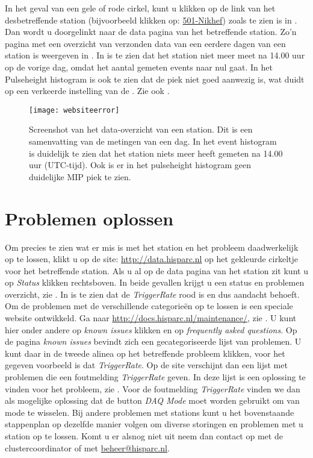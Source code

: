 In het geval van een gele of rode cirkel, kunt u klikken op de link van
het desbetreffende station (bijvoorbeeld klikken op:
\underline{501-Nikhef}) zoals te zien is in . Dan
wordt u doorgelinkt naar de data pagina van het betreffende station.
Zo'n pagina met een overzicht van verzonden data van een eerdere dagen
van een station is weergeven in . In
 is te zien dat het station niet meer meet na
14.00 uur op de vorige dag,  omdat het aantal gemeten events naar nul
gaat. In het Pulseheight histogram is ook te zien dat de \mip piek niet
goed aanwezig is, wat duidt op een verkeerde instelling van de \pmt. Zie
ook \cite{inregelen}.

\begin{figure} 
    \centering 
    \texttt{[image: websiteerror]}
    \caption{Screenshot van het data-overzicht van een station. Dit is
             een samenvatting van de metingen van een dag. In het event
             histogram is duidelijk te zien dat het station niets meer
             heeft gemeten na 14.00 uur (UTC-tijd). Ook is er in het
             pulseheight histogram geen duidelijke MIP piek te zien.}
    \label{fig:websiteerror} 
\end{figure}


\section{Problemen oplossen}

Om precies te zien wat er mis is met het station en het probleem
daadwerkelijk op te lossen, klikt u op de site:
\url{http://data.hisparc.nl} op het gekleurde cirkeltje voor het
betreffende station. Als u al op de data pagina van het station zit kunt
u op \emph{Status} klikken rechtsboven. In beide gevallen krijgt u een
status en problemen overzicht, zie . In
 is te zien dat de \emph{TriggerRate} rood is
en dus aandacht behoeft. Om de problemen met de verschillende
categorieën op te lossen is een speciale website ontwikkeld. Ga naar
\url{http://docs.hisparc.nl/maintenance/}, zie .
U kunt hier onder andere op \emph{known issues} klikken en op
\emph{frequently asked questions}. Op de pagina \emph{known issues}
bevindt zich een gecategoriseerde lijst van problemen. U kunt daar in de
tweede alinea op het betreffende probleem klikken, voor het gegeven
voorbeeld is dat \emph{TriggerRate}. Op de site verschijnt dan een lijst
met problemen die een foutmelding \emph{TriggerRate} geven. In deze
lijst is een oplossing te vinden voor het probleem, zie
. Voor de foutmelding \emph{TriggerRate} vinden we
dan als mogelijke oplossing dat de button \emph{DAQ Mode} moet worden
gebruikt om van mode te wisselen. Bij andere problemen met stations kunt
u het bovenstaande stappenplan op dezelfde manier volgen om diverse
storingen en problemen met u station op te lossen. Komt u er alsnog niet
uit neem dan contact op met de clustercoordinator of met
\url{beheer@hisparc.nl}.
 

